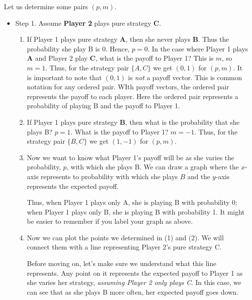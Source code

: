  Let us determine some pairs $(p, m)$.
\begin{itemize}
\item Step 1. Assume {\bf Player 2} plays pure strategy {\bf C}.
\begin{enumerate}
\item If Player 1 plays pure strategy {\bf A}, then she never plays {\bf B}. Thus the probability she play B is 0. Hence,  $p=0$. In the case where Player 1 plays {\bf A} and Player 2 play {\bf C}, what is the payoff to Player 1? This is $m$, so $m=1$. Thus, for the strategy pair $\{A, C\}$ we get $(0, 1)$ for $(p, m)$. It is important to note that $(0, 1)$ is {\it not} a payoff vector. This is common notation for any ordered pair. WIth payoff vectors, the ordered pair represents the payoff to each player. Here the ordered pair represents a probability of playing B and the payoff to Player 1.
\item If Player 1 plays pure strategy {\bf B}, then what is the probability that she plays B? $p=1$. What is the payoff to Player 1? $m=-1$. Thus, for the strategy pair $\{B, C\}$ we get $(1, -1)$ for $(p, m)$.
\item Now we want to know what Player 1's payoff will be as she varies the probability, $p$, with which she plays B. We can draw a graph where the $x$-axis represents to probability with which she plays $B$ and the $y$-axis represents the expected payoff.

\begin{figure}[h]
\leavevmode
\begin{center}
{\scalebox{.65}{}}
\end{center}
\end{figure}  

Thus, when Player 1 plays only A, she is playing B with probability 0; when Player 1 plays only B, she is playing B with probability 1. It might be easier to remember if you label your graph as above.
\item Now we can plot the points we determined in (1) and (2). We will connect them with a line representing Player 2's pure strategy C.

\begin{figure}[h]
\leavevmode
\begin{center}
{\scalebox{.65}{}}
\end{center}
\end{figure}  

Before moving on, let's make sure we understand what this line represents. Any point on it represents the expected payoff to Player 1 as she varies her strategy, {\it assuming Player 2 only plays C}. In this case, we can see that as she plays B more often, her expected payoff goes down. 
\end{enumerate}


\end{itemize}
